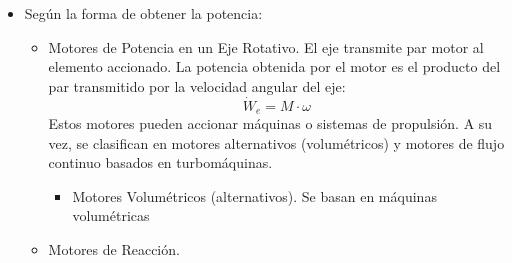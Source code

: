 \begin{itemize}
\begin{itemize}
        \begin{equation}
            \eta_t = \frac{\dot{W}_u}{\dot{Q}_{FC}} = \frac{\dot{W}_u}{\dot{W}_u + \dot{Q}_{FF}}
        \end{equation}
        Estos motores son normalmente de ciclo cerrado, pues el fluido de trabajo una vez expandido puede recuperarse para recibir de nuevo el estado térmico y volver a producir trabajo en la máquina motora al no sufrir transformaciones química.
        \item Motores de Combustión Interna. En esos el proceso de combustión ocurre en el mismo fluido de trabajo, por lo tanto, no es necesario el proceso de transferencia de calor y en la máquina térmica motora se expanden los gases provenientes de la combustión. En estos motores entra aire y combustible ($\dot{m}_a$ y $\dot{m}_f$) a temperatura del medio ambiente y el combustible tiene una energía química basada en sus entalpías de formación de sus componentes, que es su poder calorífico. Normalmente se utiliza el poder calorífico inferior (PCI) o entalpía de combustión ($H_c$). Como energías salientes están la potencia útil ($\dot{W}_u$), la energía térmica por pérdidas de calor ($\dot{Q}$) y la energía de los gases de escape, que está a su vez compuesta por la suma de la energía térmica y la energía química de los posibles productos de combustión incompleta.
        \begin{equation}
            \eta_t = \frac{\dot{W}_u}{\dot{m}_f \cdot H_c}
        \end{equation}
        Estos motores son necesariamente de ciclo abierto, pues no pueden reutilizar los gases de la combustión para realizar de nuevo otra combustión.
    \end{itemize}
    \item Según la forma de obtener la potencia:
    \begin{itemize}
        \item Motores de Potencia en un Eje Rotativo. El eje transmite par motor al elemento accionado. La potencia obtenida por el motor es el producto del par transmitido por la velocidad angular del eje:
        \begin{equation}
            \dot{W}_e = M \cdot \omega
        \end{equation}
        Estos motores pueden accionar máquinas o sistemas de propulsión. A su vez, se clasifican en motores alternativos (volumétricos) y motores de flujo continuo basados en turbomáquinas.
        \begin{itemize}
            \item Motores Volumétricos (alternativos). Se basan en máquinas volumétricas
        \end{itemize}
        \item Motores de Reacción.
    \end{itemize}
\end{itemize}

